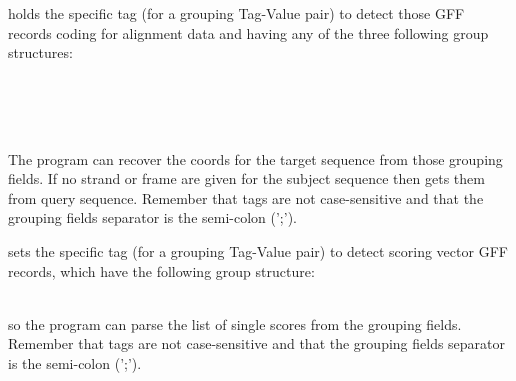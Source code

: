    {  holds the specific tag (for a grouping Tag-Value pair) to detect those GFF records coding for alignment data and having any of the three following group structures:\\[1.5ex] 
 \begin{minipage}{\linewidth} \begin{small} \flushleft \hspace{0.5cm} \\[1.5ex] \hspace{0.5cm} \\[1.5ex] \hspace{0.5cm} \end{small} \end{minipage}\\[1.5ex] 
 The program can recover the coords for the target sequence from those grouping fields. If no strand or frame are given for the subject sequence then {\prog} gets them from query sequence. Remember that tags are not case-sensitive and that the grouping fields separator is the semi-colon (';'). }
%
   {  sets the specific tag (for a grouping Tag-Value pair) to detect scoring vector GFF records, which have the following group structure: \\[1.5ex] 
 \begin{minipage}{\linewidth} \begin{small} \flushleft \hspace{0.5cm} \end{small} \end{minipage}\\[1.5ex] 
 so the program can parse the list of single scores from the grouping fields. Remember that tags are not case-sensitive and that the grouping fields separator is the semi-colon (';'). }
